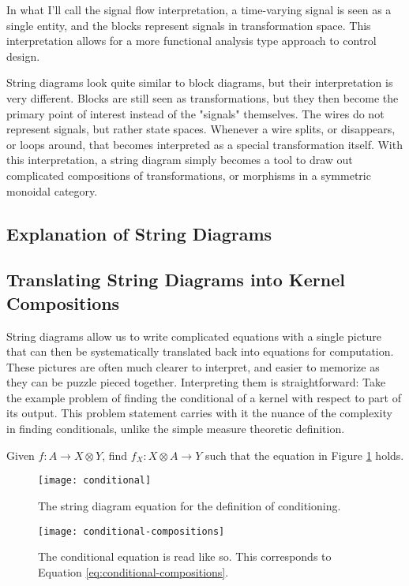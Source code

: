 In what I'll call the signal flow interpretation, a time-varying signal is seen as a single entity, and the blocks represent signals in transformation space. This interpretation allows for a more functional analysis type approach to control design.

String diagrams look quite similar to block diagrams, but their interpretation is very different.
Blocks are still seen as transformations, but they then become the primary point of interest instead of the "signals" themselves.
The wires do not represent signals, but rather state spaces.
Whenever a wire splits, or disappears, or loops around, that becomes interpreted as a special transformation itself.
With this interpretation, a string diagram simply becomes a tool to draw out complicated compositions of transformations, or morphisms in a symmetric monoidal category.

\subsection{Explanation of String Diagrams}

\subsection{Translating String Diagrams into Kernel Compositions}
String diagrams allow us to write complicated equations with a single picture that can then be systematically translated back into equations for computation.
These pictures are often much clearer to interpret, and easier to memorize as they can be puzzle pieced together.
Interpreting them is straightforward: Take the example problem of finding the conditional of a kernel with respect to part of its output.
This problem statement carries with it the nuance of the complexity in finding conditionals, unlike the simple measure theoretic definition.

Given $f:A\rightarrow X\otimes Y$, find $f_X : X\otimes A \rightarrow Y$ such that the equation in Figure \ref{fig:conditional} holds.

\begin{figure}[htb]
	\centering
	\texttt{[image: conditional]}
	\caption{The string diagram equation for the definition of conditioning.}
	\label{fig:conditional}
\end{figure}

\begin{figure}[htb]
	\centering
	\texttt{[image: conditional-compositions]}
	\caption{The conditional equation is read like so. This corresponds to Equation \ref{eq:conditional-compositions}.}
	\label{fig:conditional-compositions}
\end{figure}

